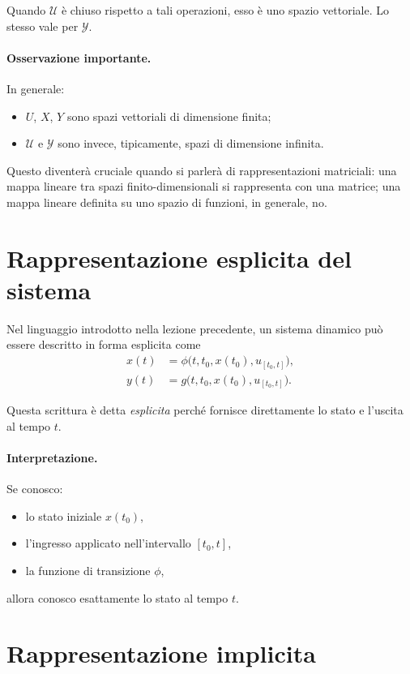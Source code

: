 Quando $\mathcal{U}$ è chiuso rispetto a tali operazioni, esso è uno spazio vettoriale. Lo stesso vale per $\mathcal{Y}$.

\paragraph{Osservazione importante.}
In generale:
\begin{itemize}
    \item $U$, $X$, $Y$ sono spazi vettoriali di dimensione finita;
    \item $\mathcal{U}$ e $\mathcal{Y}$ sono invece, tipicamente, spazi di dimensione infinita.
\end{itemize}

Questo diventerà cruciale quando si parlerà di rappresentazioni matriciali: una mappa lineare tra spazi finito-dimensionali si rappresenta con una matrice; una mappa lineare definita su uno spazio di funzioni, in generale, no.

\section{Rappresentazione esplicita del sistema}

Nel linguaggio introdotto nella lezione precedente, un sistema dinamico può essere descritto in forma esplicita come
\begin{align}
x(t) &= \phi\bigl(t,t_0,x(t_0),u_{[t_0,t]}\bigr), \label{eq:L2_phi}\\
y(t) &= g\bigl(t,t_0,x(t_0),u_{[t_0,t]}\bigr). \label{eq:L2_gglob}
\end{align}

Questa scrittura è detta \emph{esplicita} perché fornisce direttamente lo stato e l'uscita al tempo $t$.

\paragraph{Interpretazione.}
Se conosco:
\begin{itemize}
    \item lo stato iniziale $x(t_0)$,
    \item l'ingresso applicato nell'intervallo $[t_0,t]$,
    \item la funzione di transizione $\phi$,
\end{itemize}
allora conosco esattamente lo stato al tempo $t$.

\section{Rappresentazione implicita}

